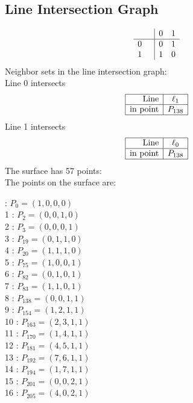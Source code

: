 \documentclass{article}
\begin{document}
{\subsection*{Line Intersection Graph}
{\arraycolsep=1pt
$$
\begin{array}{rr|*{2}r}
 &  & 0 & 1\\
\hline
0 &  & 0 & 1\\
1 &  & 1 & 0\\
\end{array}
$$
}%
Neighbor sets in the line intersection graph:\\
Line 0 intersects 
$$
\begin{array}{|r*{1}{|c}|}
\hline
\mbox{Line}  & \ell_{1}\\
\hline
\mbox{in point}  & P_{138}\\
\hline
\end{array}
$$
Line 1 intersects 
$$
\begin{array}{|r*{1}{|c}|}
\hline
\mbox{Line}  & \ell_{0}\\
\hline
\mbox{in point}  & P_{138}\\
\hline
\end{array}
$$
The surface has 57 points:\\
The points on the surface are:\\
\begin{multicols}{3}
 : $P_{0}=( 1, 0, 0, 0 )$\\
1 : $P_{2}=( 0, 0, 1, 0 )$\\
2 : $P_{3}=( 0, 0, 0, 1 )$\\
3 : $P_{19}=( 0, 1, 1, 0 )$\\
4 : $P_{20}=( 1, 1, 1, 0 )$\\
5 : $P_{75}=( 1, 0, 0, 1 )$\\
6 : $P_{82}=( 0, 1, 0, 1 )$\\
7 : $P_{83}=( 1, 1, 0, 1 )$\\
8 : $P_{138}=( 0, 0, 1, 1 )$\\
9 : $P_{154}=( 1, 2, 1, 1 )$\\
10 : $P_{163}=( 2, 3, 1, 1 )$\\
11 : $P_{170}=( 1, 4, 1, 1 )$\\
12 : $P_{181}=( 4, 5, 1, 1 )$\\
13 : $P_{192}=( 7, 6, 1, 1 )$\\
14 : $P_{194}=( 1, 7, 1, 1 )$\\
15 : $P_{201}=( 0, 0, 2, 1 )$\\
16 : $P_{205}=( 4, 0, 2, 1 )$\\

\end{multicols}}
\end{document}
